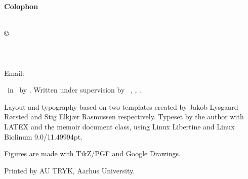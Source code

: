 \documentclass[../main.tex]{subfiles} %
\begin{document}
\thispagestyle{empty} %

\vspace*{\fill} %

\begin{center} %
    \textbf{\textsf{Colophon}} %
\end{center}
\vspace{1em} %

\noindent %
\textsl{\Title}\\

\noindent
$\copyright$ \Year\ \Author\\
\Department\\
\University\\
\DepartmentAddress\\
Email: \AuthorEmail \vspace{1.5em} %



\noindent %
\Doctype\ in \MakeLowercase{\SubjectOfStudy}\ by \Author. Written under supervision by \SupervisorTitle\ \Supervisor, \Department, \University.
\vspace{.5em} %

\noindent %
Layout and typography based on two templates created by Jakob Lysgaard Rørsted and
Stig Elkjær Rasmussen respectively. Typeset by the author with LATEX and the memoir
document class, using Linux Libertine and Linux Biolinum 9.0/11.49994pt.
\vspace{.5em} %

\noindent %
Figures are made with TikZ/PGF and Google Drawings.
\vspace{.5em} %

\noindent %
Printed by AU TRYK, Aarhus University.

\end{document}
